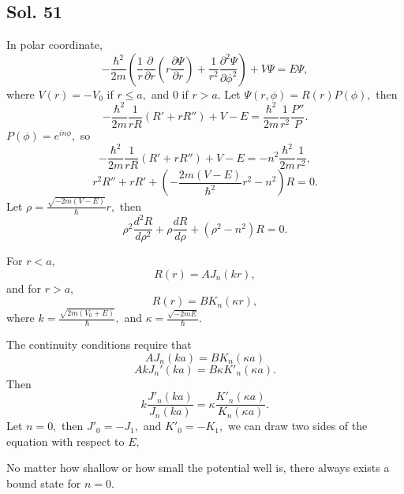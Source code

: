         \subsection*{Sol. 51}
        In polar coordinate,
        $$
        -\frac{\hbar^2}{2m}
        (\frac{1}{r}\frac{\partial}{\partial r}(r\frac{\partial\Psi}{\partial r}) + 
        \frac{1}{r^2}\frac{\partial^2\Psi}{\partial\phi^2}
        ) + V\Psi = E\Psi,
        $$
        where $V(r)=-V_0$ if $r\leq a,$ and $0$ if $r>a.$
        Let $\Psi(r,\phi)=R(r)P(\phi),$
        then
        $$
        -\frac{\hbar^2}{2m}\frac{1}{rR}(R'+rR'')
        +V-E
        =
        \frac{\hbar^2}{2m}\frac{1}{r^2}
        \frac{P''}{P}.
        $$
        $P(\phi)=e^{in\phi},$ so
        $$
        -\frac{\hbar^2}{2m}\frac{1}{rR}(R'+rR'')
        +V-E
        =
        -n^2\frac{\hbar^2}{2m}\frac{1}{r^2},
        $$
        $$
        r^2R'' + rR'
        +(-\frac{2m(V-E)}{\hbar^2}r^2-n^2)R = 0.
        $$
        Let $\rho = \frac{\sqrt{-2m(V-E)}}{\hbar}r,$ then
        $$
        \rho^2\frac{d^2R}{d\rho^2} + \rho \frac{d R}{d\rho}
        +(\rho^2-n^2)R = 0.
        $$

        For $r<a,$
        $$
        R(r) = AJ_n\left(kr\right),
        $$
        and for $r>a,$
        $$
        R(r) = BK_n\left(\kappa r\right),
        $$
        where $k=\frac{\sqrt{2m(V_0+E)}}{\hbar},$ and 
        $\kappa = \frac{\sqrt{-2mE}}{\hbar}.$

        The continuity conditions require that 
        $$
        AJ_n(ka) = 
        BK_n(\kappa a)
        $$
        $$
        AkJ_n'(ka) = B\kappa K'_n(\kappa a).
        $$
        Then
        $$
        k\frac{J'_n(ka)}{J_n(ka)}
        =\kappa \frac{K'_n(\kappa a)}{K_n(\kappa a)}.
        $$
        Let $n=0,$ then $J'_0 = -J_1,$ and $K'_0 = -K_1,$ we can draw two sides of the equation with respect to $E,$
        \begin{figure}[htbp]
    \centering
    \begin{subfigure}{0.32\textwidth}
        \centering
        
        \label{fig:sub1}
    \end{subfigure}
    \hfill
    \begin{subfigure}{0.32\textwidth}
        \centering
        
        \label{fig:sub2}
    \end{subfigure}
    \hfill
    \begin{subfigure}{0.32\textwidth}
        \centering
        
        \label{fig:sub3}
    \end{subfigure}
    
    \label{fig:2dimwell}
\end{figure}
No matter how shallow or how small the potential well is, there always exists a bound state for $n=0.$
        
